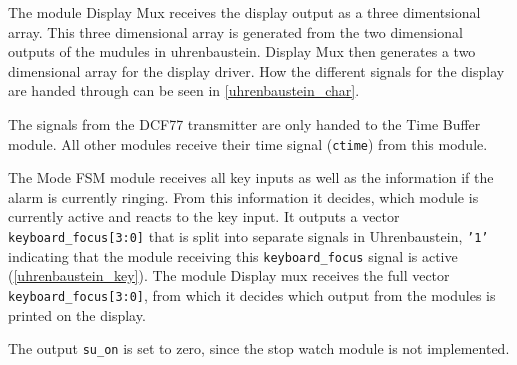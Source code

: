 \documentclass[a4paper]{article}
\begin{document}
The module Display Mux receives the display output as a three dimentsional array.
This three dimensional array is generated from the two dimensional outputs of the mudules in uhrenbaustein.
Display Mux then generates a two dimensional array for the display driver.
How the different signals for the display are handed through can be seen in \ref{uhrenbaustein_char}.

The signals from the DCF77 transmitter are only handed to the Time Buffer module. All other modules receive their time signal (\texttt{ctime}) from this module.

The Mode FSM module receives all key inputs as well as the information if the alarm is currently ringing. 
From this information it decides, which module is currently active and reacts to the key input. 
It outputs a vector \texttt{keyboard\_focus[3:0]} that is split into separate signals in Uhrenbaustein, \texttt{'1'} indicating that the module receiving this \texttt{keyboard\_focus} signal is active (\ref{uhrenbaustein_key}).
The module Display mux receives the full vector \texttt{keyboard\_focus[3:0]}, from which it decides which output from the modules is printed on the display.

The output \texttt{su\_on} is set to zero, since the stop watch module is not implemented.
\end{document}
